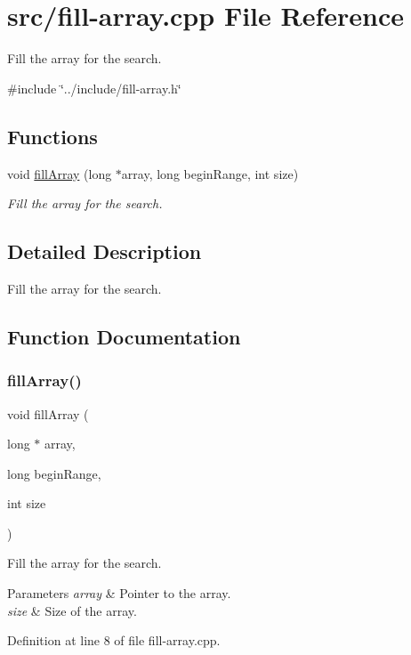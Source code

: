 \hypertarget{fill-array_8cpp}{}\section{src/fill-\/array.cpp File Reference}
\label{fill-array_8cpp}


Fill the array for the search.  


{\ttfamily \#include \char`\"{}../include/fill-\/array.\+h\char`\"{}}\newline
\subsection*{Functions}
\begin{DoxyCompactItemize}
\item 
void \mbox{\hyperlink{fill-array_8cpp_a8bd6f3771616094f7842bc1a0d6c30ec}{fill\+Array}} (long $\ast$array, long begin\+Range, int size)
\begin{DoxyCompactList}\small\item\em Fill the array for the search. \end{DoxyCompactList}\end{DoxyCompactItemize}


\subsection{Detailed Description}
Fill the array for the search. 



\subsection{Function Documentation}
\mbox{\label{fill-array_8cpp_a8bd6f3771616094f7842bc1a0d6c30ec}} 
\subsubsection{\texorpdfstring{fillArray()}{fillArray()}}
{\footnotesize\ttfamily void fill\+Array (\begin{DoxyParamCaption}\item[{long $\ast$}]{array,  }\item[{long}]{begin\+Range,  }\item[{int}]{size }\end{DoxyParamCaption})}



Fill the array for the search. 


\begin{DoxyParams}{Parameters}
{\em array} & Pointer to the array. \\
\hline
{\em size} & Size of the array. \\
\hline
\end{DoxyParams}


Definition at line 8 of file fill-\/array.\+cpp.


